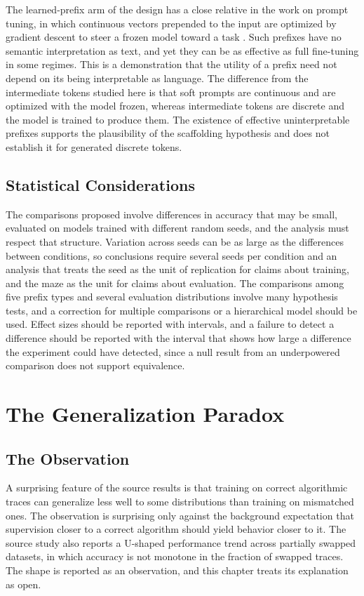 The learned-prefix arm of the design has a close relative in the work on prompt tuning, in which continuous vectors prepended to the input are optimized by gradient descent to steer a frozen model toward a task \cite{lester2021}. Such prefixes have no semantic interpretation as text, and yet they can be as effective as full fine-tuning in some regimes. This is a demonstration that the utility of a prefix need not depend on its being interpretable as language. The difference from the intermediate tokens studied here is that soft prompts are continuous and are optimized with the model frozen, whereas intermediate tokens are discrete and the model is trained to produce them. The existence of effective uninterpretable prefixes supports the plausibility of the scaffolding hypothesis and does not establish it for generated discrete tokens.

\section{Statistical Considerations}

The comparisons proposed involve differences in accuracy that may be small, evaluated on models trained with different random seeds, and the analysis must respect that structure. Variation across seeds can be as large as the differences between conditions, so conclusions require several seeds per condition and an analysis that treats the seed as the unit of replication for claims about training, and the maze as the unit for claims about evaluation. The comparisons among five prefix types and several evaluation distributions involve many hypothesis tests, and a correction for multiple comparisons or a hierarchical model should be used. Effect sizes should be reported with intervals, and a failure to detect a difference should be reported with the interval that shows how large a difference the experiment could have detected, since a null result from an underpowered comparison does not support equivalence.

\chapter{The Generalization Paradox}
\label{ch:paradox}

\section{The Observation}

A surprising feature of the source results is that training on correct algorithmic traces can generalize less well to some distributions than training on mismatched ones. The observation is surprising only against the background expectation that supervision closer to a correct algorithm should yield behavior closer to it. The source study also reports a U-shaped performance trend across partially swapped datasets, in which accuracy is not monotone in the fraction of swapped traces. The shape is reported as an observation, and this chapter treats its explanation as open.


